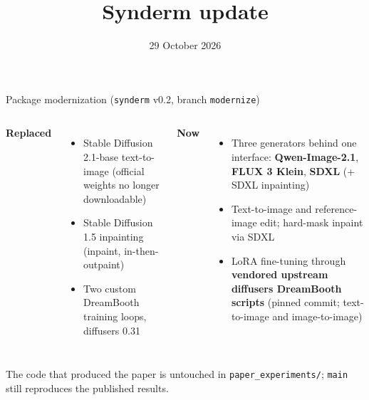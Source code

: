\documentclass[aspectratio=169,11pt]{beamer}
\title{Synderm update}
\subtitle{}
\author{}
\date{29 October 2026}
\newcommand{\muted}[1]{{\color{gray}\footnotesize #1}}
\begin{document}
\begin{frame}
  \titlepage
\end{frame}

\begin{frame}{Package modernization (\texttt{synderm} v0.2, branch \texttt{modernize})}
  \begin{columns}[T]
    \textbf{Replaced}
    \begin{itemize}
      \item Stable Diffusion 2.1-base text-to-image \muted{(official weights no longer downloadable)}
      \item Stable Diffusion 1.5 inpainting (inpaint, in-then-outpaint)
      \item Two custom DreamBooth training loops, diffusers 0.31
    \end{itemize}
    \textbf{Now}
    \begin{itemize}
      \item Three generators behind one interface: \textbf{Qwen-Image-2.1}, \textbf{FLUX 3 Klein}, \textbf{SDXL} (+ SDXL inpainting)
      \item Text-to-image and reference-image edit; hard-mask inpaint via SDXL
      \item LoRA fine-tuning through \textbf{vendored upstream diffusers DreamBooth scripts} (pinned commit; text-to-image and image-to-image)
    \end{itemize}
  \end{columns}
  \vspace{1em}
  \muted{The code that produced the paper is untouched in \texttt{paper\_experiments/}; \texttt{main} still reproduces the published results.}
\end{frame}
\end{document}
